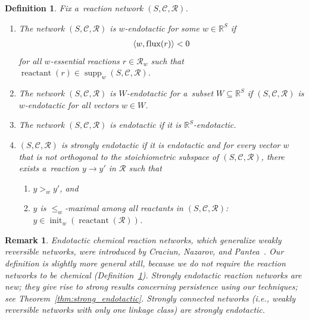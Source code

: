 \documentclass[pdftex]{sigma}
\newtheorem{Definition}[Theorem]{Definition}
\newtheorem{Remark}[Theorem]{Remark}
\newcommand{\source}[1]{\operatorname{reactant}(#1)}
\newcommand{\flux}[1]{\operatorname{f\/lux}(#1)} %
\newcommand{\init}[2]{\operatorname{init}_{#1}\left(#2\right)}
\newcommand{\supp}[2]{\operatorname{supp}_{#1}\left(#2\right)}
\begin{document}
\begin{Definition}
\label{def:endotactic}
Fix a~reaction network $(S,\mathcal C,\mathcal R)$.
\begin{enumerate}\itemsep=0pt
\item The network $(S,\mathcal C,\mathcal R)$ is $w$-\emph{endotactic} for some $w\in\mathbb{R}^S$ if
\begin{gather*}
\langle w,\flux{r}\rangle<0
\end{gather*}
for all $w$-essential reactions $r\in\mathcal R_w$ such that $\source{r}\in\supp w{S,\mathcal C,\mathcal R}$.

\item The network $(S,\mathcal C,\mathcal R)$ is \emph{$W$-endotactic} for a~subset $W\subseteq\mathbb{R}^S$ if
$(S,\mathcal C,\mathcal R)$ is $w$-endotactic for all vectors $w\in W$.

\item The network $(S,\mathcal C,\mathcal R)$ is \emph{endotactic} if it is $\mathbb{R}^S$-endotactic.

\item\label{def:strong_endotactic}
$(S,\mathcal C,\mathcal R)$ is \emph{strongly endotactic} if it is endotactic and for every vector $w$ that is not
ortho\-go\-nal to the stoichiometric subspace of $(S,\mathcal C,\mathcal R)$, there exists a~reaction $y\to y'$ in
$\mathcal R$ such that
\begin{enumerate}\itemsep=0pt
\item[$(i)$] $y>_w y'$, and
\item[$(ii)$] $y$ is $\leq_w$-maximal among all reactants in $(S,\mathcal C,\mathcal R)$:
$y\in\init{w}{\source{\mathcal R}}$.
\end{enumerate}
\end{enumerate}

\end{Definition}
\begin{Remark}\label{r:endotactic}
Endotactic chemical reaction networks, which generalize weakly reversible networks, were introduced by Craciun,
Nazarov, and Pantea~\cite[\S~4]{CNP}.
Our def\/inition is slightly more general still, because we do not require the reaction networks to be chemical
(Def\/inition~\ref{def:endotactic}).
Strongly endotactic reaction networks are new; they give rise to strong results concerning persistence using our
techniques; see Theorem~\ref{thm:strong_endotactic}.
Strongly connected networks (i.e., weakly reversible networks with only one linkage class) are strongly endotactic.
\end{Remark}
\end{document}
